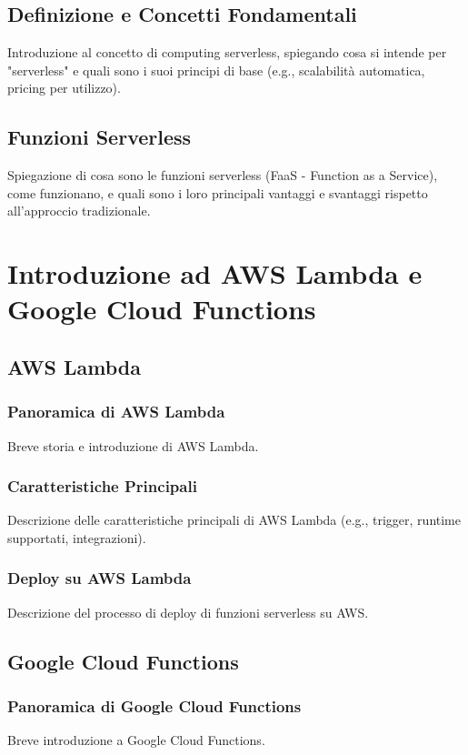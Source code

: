 \documentclass[12pt,a4paper,twoside]{book}
\begin{document}
\section{Definizione e Concetti Fondamentali}
Introduzione al concetto di computing serverless, spiegando cosa si intende per "serverless" e quali sono i suoi principi di base (e.g., scalabilità automatica, pricing per utilizzo).

\section{Funzioni Serverless}
Spiegazione di cosa sono le funzioni serverless (FaaS - Function as a Service), come funzionano, e quali sono i loro principali vantaggi e svantaggi rispetto all'approccio tradizionale.

\chapter{Introduzione ad AWS Lambda e Google Cloud Functions}

\section{AWS Lambda}
\subsection{Panoramica di AWS Lambda}
Breve storia e introduzione di AWS Lambda.

\subsection{Caratteristiche Principali}
Descrizione delle caratteristiche principali di AWS Lambda (e.g., trigger, runtime supportati, integrazioni).

\subsection{Deploy su AWS Lambda}
Descrizione del processo di deploy di funzioni serverless su AWS.

\section{Google Cloud Functions}
\subsection{Panoramica di Google Cloud Functions}
Breve introduzione a Google Cloud Functions.
\end{document}
